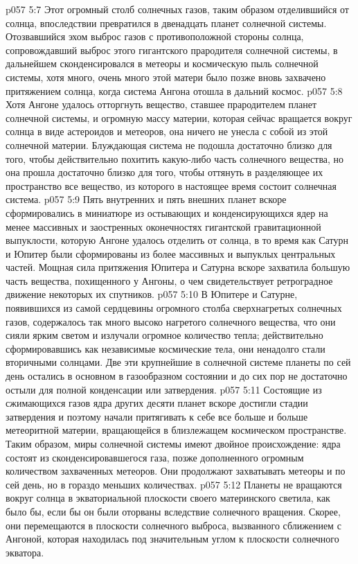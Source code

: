 \vs p057 5:7 Этот огромный столб солнечных газов, таким образом отделившийся от солнца, впоследствии превратился в двенадцать планет солнечной системы. Отозвавшийся эхом выброс газов с противоположной стороны солнца, сопровождавший выброс этого гигантского прародителя солнечной системы, в дальнейшем сконденсировался в метеоры и космическую пыль солнечной системы, хотя много, очень много этой матери было позже вновь захвачено притяжением солнца, когда система Ангона отошла в дальний космос.
\vs p057 5:8 Хотя Ангоне удалось отторгнуть вещество, ставшее прародителем планет солнечной системы, и огромную массу материи, которая сейчас вращается вокруг солнца в виде астероидов и метеоров, она ничего не унесла с собой из этой солнечной материи. Блуждающая система не подошла достаточно близко для того, чтобы действительно похитить какую\hyp{}либо часть солнечного вещества, но она прошла достаточно близко для того, чтобы оттянуть в разделяющее их пространство все вещество, из которого в настоящее время состоит солнечная система.
\vs p057 5:9 Пять внутренних и пять внешних планет вскоре сформировались в миниатюре из остывающих и конденсирующихся ядер на менее массивных и заостренных оконечностях гигантской гравитационной выпуклости, которую Ангоне удалось отделить от солнца, в то время как Сатурн и Юпитер были сформированы из более массивных и выпуклых центральных частей. Мощная сила притяжения Юпитера и Сатурна вскоре захватила большую часть вещества, похищенного у Ангоны, о чем свидетельствует ретроградное движение некоторых их спутников.
\vs p057 5:10 В Юпитере и Сатурне, появившихся из самой сердцевины огромного столба сверхнагретых солнечных газов, содержалось так много высоко нагретого солнечного вещества, что они сияли ярким светом и излучали огромное количество тепла; действительно сформировавшись как независимые космические тела, они ненадолго стали вторичными солнцами. Две эти крупнейшие в солнечной системе планеты по сей день остались в основном в газообразном состоянии и до сих пор не достаточно остыли для полной конденсации или затвердения.
\vs p057 5:11 Состоящие из сжимающихся газов ядра других десяти планет вскоре достигли стадии затвердения и поэтому начали притягивать к себе все больше и больше метеоритной материи, вращающейся в близлежащем космическом пространстве. Таким образом, миры солнечной системы имеют двойное происхождение: ядра состоят из сконденсировавшегося газа, позже дополненного огромным количеством захваченных метеоров. Они продолжают захватывать метеоры и по сей день, но в гораздо меньших количествах.
\vs p057 5:12 Планеты не вращаются вокруг солнца в экваториальной плоскости своего материнского светила, как было бы, если бы он были оторваны вследствие солнечного вращения. Скорее, они перемещаются в плоскости солнечного выброса, вызванного сближением с Ангоной, которая находилась под значительным углом к плоскости солнечного экватора.
